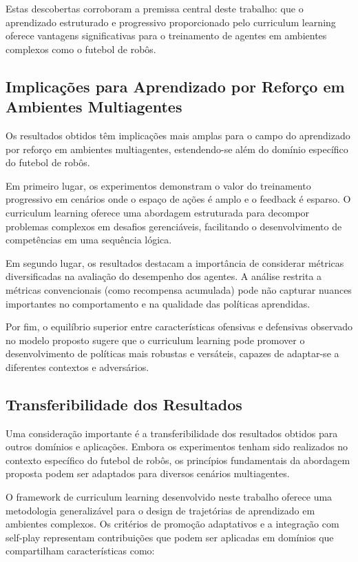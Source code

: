 Estas descobertas corroboram a premissa central deste trabalho: que o aprendizado estruturado e progressivo proporcionado pelo curriculum learning oferece vantagens significativas para o treinamento de agentes em ambientes complexos como o futebol de robôs.

\subsection{Implicações para Aprendizado por Reforço em Ambientes Multiagentes}

Os resultados obtidos têm implicações mais amplas para o campo do aprendizado por reforço em ambientes multiagentes, estendendo-se além do domínio específico do futebol de robôs.

Em primeiro lugar, os experimentos demonstram o valor do treinamento progressivo em cenários onde o espaço de ações é amplo e o feedback é esparso. O curriculum learning oferece uma abordagem estruturada para decompor problemas complexos em desafios gerenciáveis, facilitando o desenvolvimento de competências em uma sequência lógica.

Em segundo lugar, os resultados destacam a importância de considerar métricas diversificadas na avaliação do desempenho dos agentes. A análise restrita a métricas convencionais (como recompensa acumulada) pode não capturar nuances importantes no comportamento e na qualidade das políticas aprendidas.

Por fim, o equilíbrio superior entre características ofensivas e defensivas observado no modelo proposto sugere que o curriculum learning pode promover o desenvolvimento de políticas mais robustas e versáteis, capazes de adaptar-se a diferentes contextos e adversários.

\subsection{Transferibilidade dos Resultados}

Uma consideração importante é a transferibilidade dos resultados obtidos para outros domínios e aplicações. Embora os experimentos tenham sido realizados no contexto específico do futebol de robôs, os princípios fundamentais da abordagem proposta podem ser adaptados para diversos cenários multiagentes.

O framework de curriculum learning desenvolvido neste trabalho oferece uma metodologia generalizável para o design de trajetórias de aprendizado em ambientes complexos. Os critérios de promoção adaptativos e a integração com self-play representam contribuições que podem ser aplicadas em domínios que compartilham características como:

